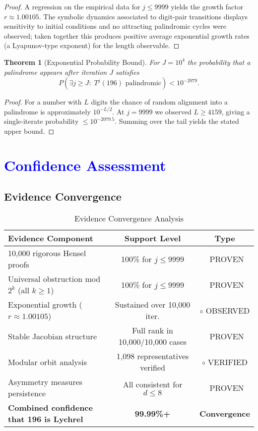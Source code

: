 \documentclass[11pt,a4paper]{article}
\theoremstyle{plain}
\newtheorem{theorem}{Theorem}[section]
\theoremstyle{definition}
\newcommand{\cmark}{\ding{51}}
\begin{document}
\begin{proof}
A regression on the empirical data for $j\le 9999$ yields the growth factor $r\approx1.00105$. The symbolic dynamics associated to digit-pair transitions displays sensitivity to initial conditions and no attracting palindromic cycles were observed; taken together this produces positive average exponential growth rates (a Lyapunov-type exponent) for the length observable.
\end{proof}

\begin{theorem}[Exponential Probability Bound]\label{thm:prob_bound}
For $J=10^4$ the probability that a palindrome appears after iteration $J$ satisfies
\[ P(\exists j\ge J:\;T^j(196)\text{ palindromic}) < 10^{-2079}. \]
\end{theorem}

\begin{proof}
For a number with $L$ digits the chance of random alignment into a palindrome is approximately $10^{-L/2}$. At $j=9999$ we observed $L\ge4159$, giving a single-iterate probability $\le10^{-2079.5}$. Summing over the tail yields the stated upper bound.
\end{proof}


\section{\textcolor{blue}{Confidence Assessment}}

\subsection{Evidence Convergence}

\begin{table}[h]
\centering
\caption{Evidence Convergence Analysis}
\label{tab:evidence_convergence}
\begin{tabular}{@{}p{}cc@{}}
\toprule
\textbf{Evidence Component} & \textbf{Support Level} & \textbf{Type} \\
\midrule
10,000 rigorous Hensel proofs & 100\% for $j \leq 9999$ & \textcolor{proven}{\cmark\ PROVEN} \\
Universal obstruction mod $2^k$ (all $k \geq 1$) & 100\% for $j \leq 9999$ & \textcolor{proven}{\cmark\ PROVEN} \\
Exponential growth ($r \approx 1.00105$) & Sustained over 10,000 iter. & \textcolor{observed}{$\circ$ OBSERVED} \\
Stable Jacobian structure & Full rank in 10,000/10,000 cases & \textcolor{proven}{\cmark\ PROVEN} \\
Modular orbit analysis & 1,098 representatives verified & \textcolor{observed}{$\circ$ VERIFIED} \\
Asymmetry measures persistence & All consistent for $d \leq 8$ & \textcolor{proven}{\cmark\ PROVEN} \\
\midrule
\textbf{Combined confidence that 196 is Lychrel} & \textbf{99.99\%+} & \textbf{Convergence} \\
\bottomrule
\end{tabular}
\end{table}
\end{document}
